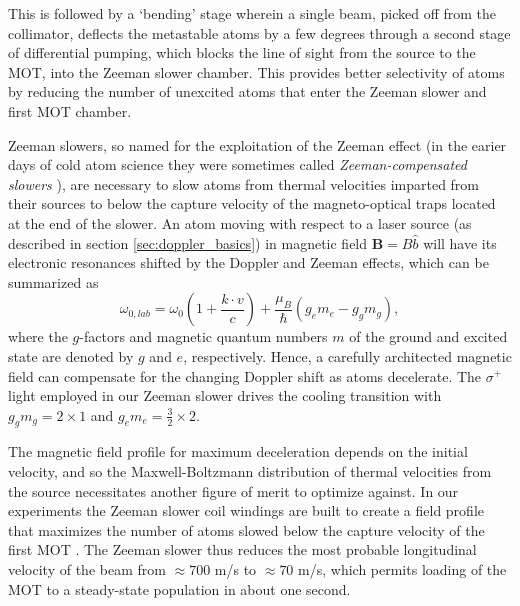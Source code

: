 	This is followed by a `bending' stage wherein a single beam, picked off from the collimator, deflects the metastable atoms by a few degrees through a second stage of differential pumping, which blocks the line of sight from the source to the MOT, into the Zeeman slower chamber.
	This provides better selectivity of \mhe atoms by reducing the number of unexcited atoms that enter the Zeeman slower and first MOT chamber.

	Zeeman slowers, so named for the exploitation of the Zeeman effect (in the earier days of cold atom science they were sometimes called \emph{Zeeman-compensated slowers} \cite{Mastwijk98}), are necessary to slow atoms from thermal velocities imparted from their sources to below the capture velocity of the magneto-optical traps located at the end of the slower.
	An atom moving with respect to a laser source (as described in section \ref{sec:doppler_basics}) in magnetic field $\textbf{B} = B\hat{b}$ will have its electronic resonances shifted by the Doppler and Zeeman effects, which can be summarized as
	\begin{equation}
		\omega_{0,lab} = \omega_{0}\left(1 + \frac{k\cdot v}{c}\right) + \frac{\mu_B }{\hbar}\left(g_e m_e - g_g m_g\right),
	\end{equation}
	where the $g$-factors and magnetic quantum numbers $m$ of the ground and excited state are denoted by $g$ and $e$, respectively. 
	Hence, a carefully architected magnetic field can compensate for the changing Doppler shift as atoms decelerate.
	The $\sigma^+$ light employed in our Zeeman slower drives the cooling transition with $g_g m_g = 2\times 1$ and $g_e m_e = \frac{3}{2}\times2$.
	
	The magnetic field profile for maximum deceleration depends on the initial velocity, and so the Maxwell-Boltzmann distribution of thermal velocities from the source necessitates another figure of merit to optimize against.
	In our experiments the Zeeman slower coil windings are built to create a field profile that maximizes the number of atoms slowed below the capture velocity of the first MOT \cite{Dedman04}.
	The Zeeman slower thus reduces the most probable longitudinal velocity of the beam from $\approx700$ m/s to $\approx70$ m/s, which permits loading of the MOT to a steady-state population in about one second.

